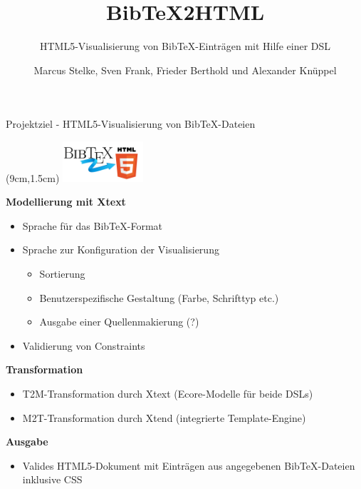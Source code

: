\documentclass[fleqn,11pt,aspectratio=43]{beamer}
\title{BibTeX2HTML}
\subtitle{HTML5-Visualisierung von BibTeX-Einträgen mit Hilfe einer DSL}
\author{Marcus Stelke, Sven Frank, Frieder Berthold und Alexander Knüppel}
\begin{document}
\begin{frame}[plain]
\titlepage
\end{frame}


{
\begin{frame}{Projektziel - HTML5-Visualisierung von BibTeX-Dateien\strut}
\begin{textblock*}{3cm}(9cm,1.5cm) %
\includegraphics[width=3cm]{../logo.png}
\end{textblock*}
\textbf{Modellierung mit Xtext}
\begin{itemize}
\item Sprache für das BibTeX-Format
\item Sprache zur Konfiguration der Visualisierung 
\begin{itemize}
\item Sortierung
\item Benutzerspezifische Gestaltung (Farbe, Schrifttyp etc.)
\item Ausgabe einer Quellenmakierung (?)
\end{itemize}
\item Validierung von Constraints
\end{itemize}

\textbf{Transformation }
\begin{itemize}
\item T2M-Transformation durch Xtext (Ecore-Modelle für beide DSLs)
\item M2T-Transformation durch Xtend (integrierte Template-Engine)
\end{itemize}

\textbf{Ausgabe}
\begin{itemize}
\item Valides HTML5-Dokument mit Einträgen aus angegebenen BibTeX-Dateien inklusive CSS
\end{itemize} 
\end{frame}
}
\end{document}
